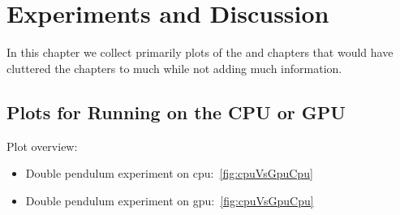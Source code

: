 \chapter{Experiments and Discussion}



In this chapter we collect primarily plots of the  and  chapters that would have cluttered the chapters to much while not adding much information.

\section{Plots for Running on the CPU or GPU}
	\label{app:plotsCpuGpu}

	Plot overview:
	\begin{itemize}
		\item Double pendulum experiment on \ac{cpu}:~\autoref{fig:cpuVsGpuCpu}
		\item Double pendulum experiment on \ac{gpu}:~\autoref{fig:cpuVsGpuCpu}
	\end{itemize}

